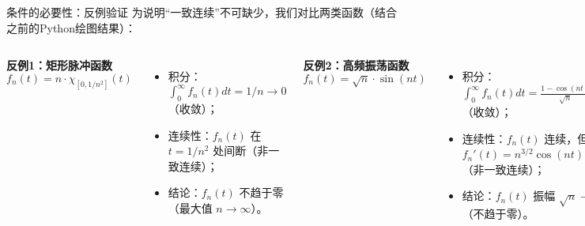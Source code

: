 \begin{frame}{条件的必要性：反例验证}
  为说明“一致连续”不可缺少，我们对比两类函数（结合之前的Python绘图结果）：

  \begin{columns}[T] %
    \textbf{反例1：矩形脉冲函数}
    \[ f_n(t) = n \cdot \chi_{[0, 1/n^2]}(t) \]
    \begin{itemize}
      \item 积分：$\int_0^\infty f_n(t)dt = 1/n \to 0$（收敛）；
      \item 连续性：$f_n(t)$ 在 $t=1/n^2$ 处间断（非一致连续）；
      \item 结论：$f_n(t)$ 不趋于零（最大值 $n \to \infty$）。
    \end{itemize}
    \vspace{0.3cm}

    \textbf{反例2：高频振荡函数}
    \[ f_n(t) = \sqrt{n} \cdot \sin(nt) \]
    \begin{itemize}
      \item 积分：$\int_0^\infty f_n(t)dt = \frac{1 - \cos(nt)}{\sqrt{n}} \to 0$（收敛）；
      \item 连续性：$f_n(t)$ 连续，但 $f_n'(t) = n^{3/2}\cos(nt)$ 无界（非一致连续）；
      \item 结论：$f_n(t)$ 振幅 $\sqrt{n} \to \infty$（不趋于零）。
    \end{itemize}
    \vspace{0.3cm}
  \end{columns}
\end{frame}

